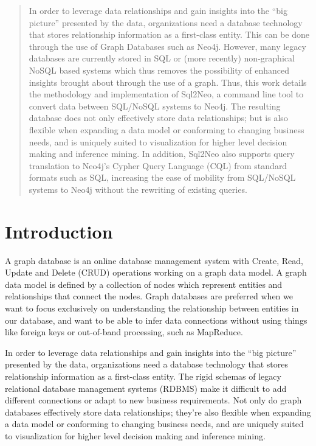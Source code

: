 \documentclass[12pt]{article}
\newcommand{\sectionfontstyle}{\fontsize{16pt}{1em}\usefont{T1}{phv}{b}{n}}
\begin{document}
    \begin{abstract}
        In order to leverage data relationships and gain insights into the ``big picture'' presented by the data, organizations need a database technology that stores relationship information as a first-class entity. This can be done through the use of Graph Databases such as Neo4j. However, many legacy databases are currently stored in SQL or (more recently) non-graphical NoSQL based systems which thus removes the possibility of enhanced insights brought about through the use of a graph. Thus, this work details the methodology and implementation of Sql2Neo, a command line tool to convert data between SQL/NoSQL systems to Neo4j. The resulting database does not only effectively store data relationships; but is also flexible when expanding a data model or conforming to changing business needs, and is uniquely suited to visualization for higher level decision making and inference mining. In addition, Sql2Neo also supports query translation to Neo4j’s Cypher Query Language (CQL) from standard formats such as SQL, increasing the ease of mobility from SQL/NoSQL systems to Neo4j without the rewriting of existing queries. 
    \end{abstract}

    \newpage

    \tableofcontents

    \newpage


    \section{\sectionfontstyle Introduction}
    A graph database is an online database management system with Create, Read, Update and Delete (CRUD) operations working on a graph data model. A graph data model is defined by a collection of nodes which represent entities and  relationships that connect the nodes. Graph databases are preferred when we want to focus exclusively on understanding the relationship between entities in our database, and want to be able to infer data connections without using things like foreign keys or out-of-band processing, such as MapReduce. 

    In order to leverage data relationships and gain insights into the ``big picture'' presented by the data, organizations need a database technology that stores relationship information as a first-class entity. The rigid schemas of legacy relational database management systems (RDBMS) make it difficult to add different connections or adapt to new business requirements. Not only do graph databases effectively store data relationships; they’re also flexible when expanding a data model or conforming to changing business needs, and are uniquely suited to visualization for higher level decision making and inference mining.
\end{document}
